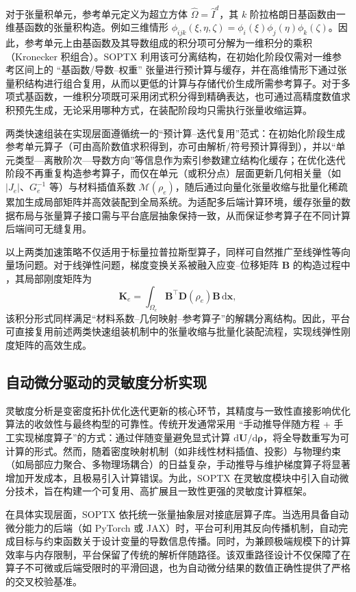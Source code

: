 对于张量积单元，参考单元定义为超立方体 $\hat\Omega=\hat I^d$，其 $k$ 阶拉格朗日基函数由一维基函数的张量积构造。例如三维情形 $\phi_{ijk}(\xi,\eta,\zeta)=\phi_i(\xi)\phi_j(\eta)\phi_k(\zeta)$。因此，参考单元上由基函数及其导数组成的积分项可分解为一维积分的乘积（Kronecker 积组合）。SOPTX 利用该可分离结构，在初始化阶段仅需对一维参考区间上的 “基函数/导数--权重” 张量进行预计算与缓存，并在高维情形下通过张量积结构进行组合复用，从而以更低的计算与存储代价生成所需参考算子。对于多项式基函数，一维积分项既可采用闭式积分得到精确表达，也可通过高精度数值求积预先生成，无论采用哪种方式，在装配阶段均只需执行张量收缩运算。

两类快速组装在实现层面遵循统一的“预计算--迭代复用”范式：在初始化阶段生成参考单元算子（可由高阶数值求积得到，亦可由解析/符号预计算得到），并以“单元类型—离散阶次—导数方向”等信息作为索引参数建立结构化缓存；在优化迭代阶段不再重复构造参考算子，而仅在单元（或积分点）层面更新几何相关量（如 $|J_e|$、$G_e^{-1}$ 等）与材料插值系数 $\mathcal{M}(\rho_e)$，随后通过向量化张量收缩与批量化稀疏累加生成局部矩阵并高效装配到全局系统。为适配多后端计算环境，缓存张量的数据布局与张量算子接口需与平台底层抽象保持一致，从而保证参考算子在不同计算后端间可无缝复用。

以上两类加速策略不仅适用于标量拉普拉斯型算子，同样可自然推广至线弹性等向量场问题。对于线弹性问题，梯度变换关系被融入应变--位移矩阵 $\boldsymbol{B}$ 的构造过程中 ，其局部刚度矩阵为
\[
\boldsymbol{K}_e=\int_{\Omega_e}\boldsymbol{B}^{\top}\boldsymbol{D}(\rho_e)\boldsymbol{B}\,\mathrm d\boldsymbol{x},
\]
该积分形式同样满足“材料系数--几何映射--参考算子”的解耦分离结构。因此，平台可直接复用前述两类快速组装机制中的张量收缩与批量化装配流程，实现线弹性刚度矩阵的高效生成。


\subsection{自动微分驱动的灵敏度分析实现}
\label{subsec:ad_sensitivity}

灵敏度分析是变密度拓扑优化迭代更新的核心环节，其精度与一致性直接影响优化算法的收敛性与最终构型的可靠性。传统开发通常采用 “手动推导伴随方程 + 手工实现梯度算子”的方式：通过伴随变量避免显式计算 $\mathrm{d}\boldsymbol{U}/\mathrm{d}\boldsymbol{\rho}$，将全导数重写为可计算的形式。然而，随着密度映射机制（如非线性材料插值、投影）与物理约束（如局部应力聚合、多物理场耦合）的日益复杂，手动推导与维护梯度算子将显著增加开发成本，且极易引入计算错误。为此，SOPTX 在灵敏度模块中引入自动微分技术，旨在构建一个可复用、高扩展且一致性更强的灵敏度计算框架。

在具体实现层面，SOPTX 依托统一张量抽象层对接底层算子库。当选用具备自动微分能力的后端（如 PyTorch 或 JAX）时，平台可利用其反向传播机制，自动完成目标与约束函数关于设计变量的导数信息传播。同时，为兼顾极端规模下的计算效率与内存限制，平台保留了传统的解析伴随路径。该双重路径设计不仅保障了在算子不可微或后端受限时的平滑回退，也为自动微分结果的数值正确性提供了严格的交叉校验基准。

